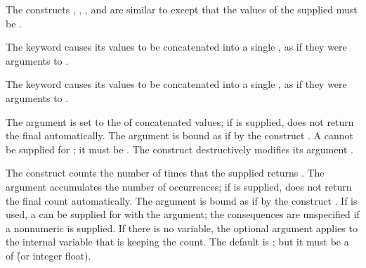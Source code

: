 The constructs , , 
, and  
are similar to  except that the
values of the supplied  must be .  
 
\beginlist
\itemitem{\bull}
The  keyword causes its  values to be concatenated 
into a single , as if 
they were arguments to .
 
\itemitem{\bull}
The  keyword causes its  values to be concatenated
into a single ,
as if they were arguments to .  
\endlist
 
The argument  is 
set to the  of 
concatenated values; if  is supplied, 
does not return the final  automatically.  
The  argument
is bound as if by the construct .
 A  cannot be supplied for ; 
it must be .
 The construct  
destructively modifies its argument .

The  construct counts the number of times that the supplied
returns .
The argument  accumulates the number of occurrences; if 
 is supplied, 
does not return the final count automatically.  The  argument
is bound as if by the construct .
 If   is used, a  can
be supplied  for 
with the  argument; the consequences are
unspecified if a nonnumeric 
 is supplied.           
  If there is no  variable, the optional 
  argument applies to the internal variable that is keeping the count.  
  The default  is ; but 
it must be a 
  of \f{(or integer float)}.
 
 

